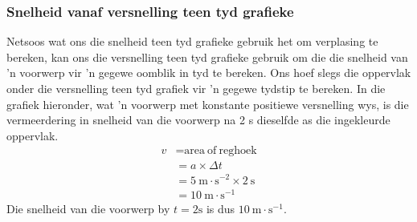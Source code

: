 \subsubsection*{Snelheid vanaf versnelling teen tyd grafieke}
            \nopagebreak
Netsoos wat ons die snelheid teen tyd grafieke gebruik het om verplasing te bereken, kan ons die versnelling teen tyd grafieke gebruik om die die snelheid van 'n voorwerp vir 'n gegewe oomblik in tyd te bereken. Ons hoef slegs die oppervlak onder die versnelling teen tyd grafiek vir 'n gegewe tydstip te bereken. In die grafiek hieronder, wat 'n voorwerp met konstante positiewe versnelling wys, is die vermeerdering in snelheid van die voorwerp na 2 s dieselfde as die ingekleurde oppervlak.
\begin{align*}
v &=\text{area}~\text{of}~\text{reghoek}\\
  &= a\ensuremath{\times}\Delta t\\ 
  &= 5~\text{m}\ensuremath{\cdot}{\text{s}}^{-2}\ensuremath{\times}2~\text{s}\\ 
  &= 10~\text{m}\ensuremath{\cdot}{\text{s}}^{-1}
\end{align*}
Die snelheid van die voorwerp by $t=2\text{s}$ is dus $10~\text{m}\ensuremath{\cdot}\text{s}{}^{-1}$. %
    \label{m38795*cid8}


